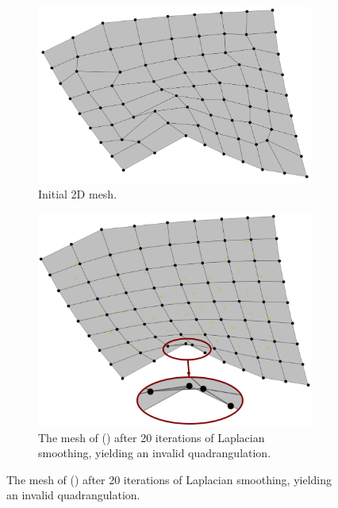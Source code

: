 \begin{figure}%
  \centering%
  \begin{subfigure}[t]{0.30\textwidth}%
    \centering%
    \includegraphics[width=\textwidth]{images/parallel_fiber_estimation/loop_025_p3728344_world_mesh.png}
    \caption{Initial 2D mesh.}%
    \label{fig:world_mesh_0}%
  \end{subfigure}
  \quad
  \begin{subfigure}[t]{0.30\textwidth}%
    \centering%
    \includegraphics[width=\textwidth]{images/parallel_fiber_estimation/loop_025_p3728344_world_mesh_improved_3.png}
    \caption{The mesh of () after 20 iterations of Laplacian smoothing, yielding an invalid quadrangulation.}%
    \label{fig:world_mesh_improved_0}%
  \end{subfigure}    

\end{figure}
